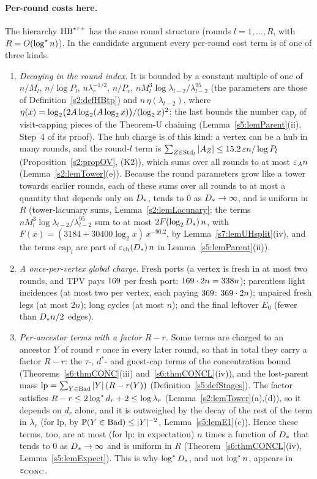 \paragraph{Per-round costs here.} The hierarchy $\mathrm{HB}^{*\tau{+}}$ has the same round
structure (rounds $l=1,\dots,R$, with $R=O(\log^{\star} n)$). In the candidate
argument every per-round cost term is of one of three kinds.
\begin{enumerate}
\item[(a)] \emph{Decaying in the round index.} It is bounded by a constant
multiple of one of $n/M_l$, $n/\log P_l$, $n\lambda_r^{-1/2}$, $n/P_r$,
$n M_l^3\log\lambda_{l-2}/\lambda_{l-2}^{95}$ (the parameters are those of
Definition~\ref{s2:defHBtp}) and $n\,\eta(\lambda_{l-2})$, where
$\eta(x)=\log_2\bigl(2A\log_2(A\log_2x)\bigr)/(\log_2x)^2$; the last
bounds the number $\mathrm{cap}_l$ of visit-capping pieces of the Theorem-U
chaining (Lemma~\ref{s5:lemParent}(ii), Step~4 of its proof). The hub charge is
of this kind: a vertex can be a hub in many rounds, and the round-$l$ term is
$\sum_{Z\in\mathrm{Std}_l}|A_Z|\le15.2\,\varepsilon n/\log P_l$ (Proposition~\ref{s2:propOV},
(K2)), which sums over all rounds to at most $\varepsilon_{A} n$
(Lemma~\ref{s2:lemTower}(e)). Because the round
parameters grow like a tower towards earlier rounds, each of these sums over all
rounds to at most a quantity that depends only on $D_{*}$, tends to $0$ as
$D_{*}\to\infty$, and is uniform in $R$ (tower-lacunary sums,
Lemma~\ref{s2:lemLacunary}; the terms
$nM_l^3\log\lambda_{l-2}/\lambda_{l-2}^{95}$ sum to at most
$2F(\log_2D_{*})\,n$, with $F(x)=(3184+30400\log_2x)\,x^{-90.2}$, by
Lemma~\ref{s7:lemUHsplit}(iv), and the terms $\mathrm{cap}_l$ are part of
$\varepsilon_{\mathrm{ch}}(D_{*})\,n$ in Lemma~\ref{s5:lemParent}(ii)).
\item[(b)] \emph{A once-per-vertex global charge.} Fresh ports (a vertex is fresh
in at most two rounds, and TPV pays $169$ per fresh port: $169\cdot2n=338
n$); parentless light incidences (at most two per vertex, each paying $369$:
$369\cdot 2n$); unpaired fresh legs (at most $2n$); long cycles (at most $n$); and the final leftover
$E_0$ (fewer than $D_{*} n/2$ edges).
\item[(c)] \emph{Per-ancestor terms with a factor $R-r$.} Some terms are charged
to an ancestor $Y$ of round $r$ once in every later round, so that in total they
carry a factor $R-r$: the $\tau$-, $d^*$- and guest-cap terms of the
concentration bound (Theorems~\ref{s6:thmCONC}(iii) and~\ref{s6:thmCONCL}(iv)),
and the lost-parent mass $\mathrm{lp}=\sum_{Y\in\mathrm{Bad}}|Y|\,(R-r(Y))$
(Definition~\ref{s5:defStages}). The factor satisfies
$R-r\le2\log^{\star} d_r+2\le\log\lambda_r$ (Lemma~\ref{s2:lemTower}(a),(d)), so it
depends on $d_r$ alone, and it is outweighed by the decay of the rest of the term
in $\lambda_r$ (for $\mathrm{lp}$, by $\mathbb{P}(Y\in\mathrm{Bad})\le|Y|^{-2}$,
Lemma~\ref{s5:lemE1}(c)). Hence these terms, too, are at most (for
$\mathrm{lp}$: in expectation) $n$ times a function of $D_{*}$ that tends to
$0$ as $D_{*}\to\infty$ and is uniform in $R$
(Theorem~\ref{s6:thmCONCL}(iv), Lemma~\ref{s5:lemExpect}). This is why
$\log^{\star}D_{*}$, and not $\log^{\star} n$, appears in $\varepsilon_{\mathrm{CONC}}$.
\end{enumerate}

